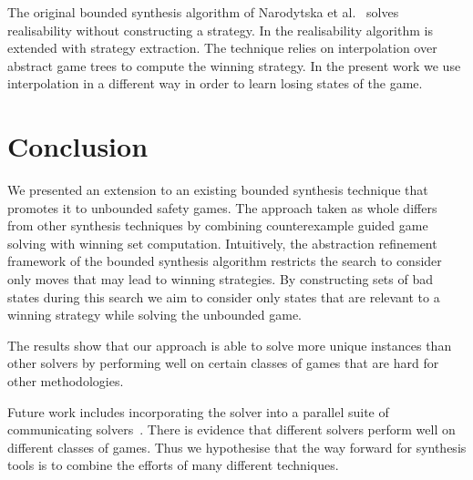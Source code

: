 \documentclass{llncs}
\begin{document}
The original bounded synthesis algorithm of Narodytska et
al.~\cite{narodytska2014} solves realisability without constructing a strategy.
In \cite{een2015} the realisability algorithm is extended with strategy
extraction. The technique relies on interpolation over abstract game trees to
compute the winning strategy.  In
the present work we use interpolation in a different way in order to learn
losing states of the game.

\section{Conclusion}

We presented an extension to an existing bounded synthesis technique that
promotes it to unbounded safety games. The approach taken as whole differs from
other synthesis techniques by combining counterexample guided game solving with
winning set computation. Intuitively, the abstraction refinement framework of
the bounded synthesis algorithm restricts the search to consider only moves
that may lead to winning strategies. By constructing sets of bad states during
this search we aim to consider only states that are relevant to a winning
strategy while solving the unbounded game.

The results show that our approach is able to solve more unique instances than
other solvers by performing well on certain classes of games that are hard for
other methodologies.

Future work includes incorporating the solver into a parallel suite of
communicating solvers~\cite{bloem2014}. There is evidence that different
solvers perform well on different classes of games. Thus we hypothesise that
the way forward for synthesis tools is to combine the efforts of many different
techniques.



\end{document}
